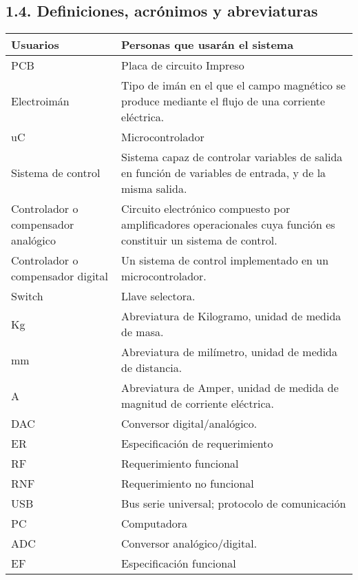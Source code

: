 \documentclass{article} %
\begin{document}
\subsection{}

\noindent 

\noindent 

\noindent 

\noindent 

\noindent 

\noindent 

\noindent 

\noindent 

\noindent 
\subsection{1.4. Definiciones, acr\'{o}nimos y abreviaturas}

\noindent 

\begin{tabular}{|p{2.0in}|p{2.3in}|} \hline 
Usuarios & Personas que usar\'{a}n el sistema \\ \hline 
PCB & Placa de circuito Impreso \\ \hline 
Electroim\'{a}n & Tipo de im\'{a}n en el que el campo magn\'{e}tico se produce mediante el flujo de una corriente el\'{e}ctrica. \\ \hline 
uC  & Microcontrolador \\ \hline 
Sistema de control & Sistema capaz de controlar variables de salida en funci\'{o}n de variables de entrada, y de la misma salida.  \\ \hline 
Controlador o compensador anal\'{o}gico & Circuito electr\'{o}nico compuesto por amplificadores operacionales cuya funci\'{o}n es constituir un sistema de control. \\ \hline 
Controlador o compensador digital & Un sistema de control implementado en un microcontrolador. \\ \hline 
Switch & Llave selectora. \\ \hline 
Kg & Abreviatura de Kilogramo, unidad de medida de masa. \\ \hline 
mm & Abreviatura de mil\'{i}metro, unidad de medida de distancia. \\ \hline 
A & Abreviatura de Amper, unidad de medida de magnitud de corriente el\'{e}ctrica. \\ \hline 
DAC & Conversor digital/anal\'{o}gico. \\ \hline 
ER & Especificaci\'{o}n de requerimiento \\ \hline 
RF & Requerimiento funcional \\ \hline 
RNF & Requerimiento no funcional \\ \hline 
USB & Bus serie universal; protocolo de comunicaci\'{o}n \\ \hline 
PC & Computadora \\ \hline 
ADC & Conversor anal\'{o}gico/digital. \\ \hline 
EF & Especificaci\'{o}n funcional \\ \hline 
\end{tabular}
\end{document}
